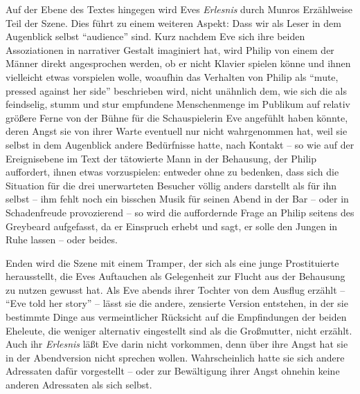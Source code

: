 \documentclass[fontsize=12pt]{scrartcl}
\begin{document}
Auf der Ebene des Textes hingegen wird Eves \textit{Erlesnis} durch Munros Erz\"ahlweise Teil der Szene. Dies f\"uhrt zu einem weiteren Aspekt: Dass wir als Leser\textsuperscript{\tiny *} in dem Augenblick \mbox{selbst} "`audience"' sind. Kurz nachdem Eve sich ihre beiden Assoziationen in narrativer Gestalt imaginiert hat, wird Philip von einem der M\"anner direkt an\-ge\-spro\-chen werden, ob er nicht Klavier spielen k\"onne und ihnen vielleicht etwas vorspielen wolle, woaufhin das Verhalten von Philip als "`mute, pressed against her side"' beschrieben wird, nicht un\"ahnlich dem, wie sich die als feindselig, stumm und stur empfundene Menschenmenge im Publikum auf relativ gr\"o{\ss}ere Ferne von der B\"uhne f\"ur die Schauspielerin Eve ange\-f\"uhlt haben k\"onnte, deren Angst sie von ihrer Warte eventuell nur nicht wahrgenommen hat, weil sie \mbox{selbst} in dem Augenblick andere Bed\"urfnisse hatte, nach Kontakt -- so wie auf der Ereignisebene im Text der t\"atowierte Mann in der Behausung, der Philip auffordert, ihnen etwas vorzuspielen: entweder ohne zu bedenken, dass sich die Situation f\"ur die drei unerwarteten Besucher\textsuperscript{\tiny *} v\"ollig anders darstellt als f\"ur ihn \mbox{selbst} -- ihm fehlt noch ein bisschen Musik f\"ur seinen Abend in der Bar -- oder in Schadenfreude provozierend -- so wird die auffordernde Frage an Philip sei\-tens des Greybeard aufgefasst, da er Einspruch erhebt und sagt, er solle den Jungen in Ruhe lassen -- oder beides.

Enden wird die Szene mit einem Tramper, der sich als eine junge Prostituierte he\-rausstellt, die Eves Auftauchen als Gelegenheit zur Flucht aus der Behausung zu nutzen gewusst hat. Als Eve abends ihrer Tochter von dem Ausflug erz\"ahlt -- "`Eve told her story"' -- l\"asst sie die andere, zensierte Version entstehen, in der sie bestimmte Dinge aus vermeintlicher R\"ucksicht auf die Emp\-fin\-dun\-gen der beiden Eheleute, die weniger alternativ eingestellt sind als die Gro{\ss}mutter, nicht erz\"ahlt. Auch ihr \textit{Erles\-nis} l\"a{\ss}t Eve darin nicht vorkommen, denn \"uber ihre Angst hat sie in der Abendversion nicht sprechen wollen. Wahrscheinlich hatte sie sich andere Adressaten\textsuperscript{\tiny *} daf\"ur vorgestellt -- oder zur Bew\"altigung ihrer Angst ohnehin keine anderen Adressaten\textsuperscript{\tiny *} als sich \mbox{selbst}.
 
\end{document}
